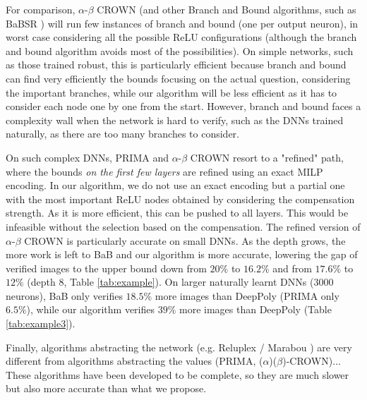 For comparison, $\alpha$-$\beta$ CROWN \cite{crown} (and other Branch and Bound algorithms, such as BaBSR \cite{BaB}) will run few instances of branch and bound (one per output neuron), in worst case considering all the possible ReLU configurations (although the branch and bound algorithm avoids most of the possibilities). On simple networks, such as those trained robust, this is particularly efficient because branch and bound can find very efficiently the bounds focusing on the actual question, considering the important branches, while our algorithm will be less efficient as it has to consider each node one by one from the start. However, branch and bound faces a complexity wall when the network is hard to verify, such as the DNNs trained naturally, as there are too many branches to consider.

On such complex DNNs, PRIMA and $\alpha$-$\beta$ CROWN resort to a "refined" path, where the bounds {\em on the first few layers} are refined \cite{MILP2} using an exact MILP encoding. In our algorithm, we do not use an exact encoding but a partial one with the most important ReLU nodes obtained by considering the compensation strength. As it is more efficient, this can be pushed to all layers. This would be infeasible without the selection based on the compensation. The refined version of $\alpha$-$\beta$ CROWN is particularly accurate on small DNNs. As the depth grows, the more work is left to BaB and our algorithm is more accurate, lowering the gap of verified images to the upper bound \cite{attack} down from 
$20\%$ to $16.2\%$ and from $17.6\%$ to $12\%$ (depth 8, Table \ref{tab:example}). On larger naturally learnt DNNs (3000 neurons), BaB only verifies $18.5\%$ more images than DeepPoly (PRIMA only $6.5\%$), while our algorithm verifies $39\%$ more images than DeepPoly (Table \ref{tab:example3}).

Finally, algorithms abstracting the network (e.g. Reluplex / Marabou \cite{Reluplex,katz2019marabou}) are very different from algorithms abstracting the values (PRIMA, ($\alpha$)($\beta$)-CROWN)\cite{prima,crown}$\ldots$ These algorithms have been developed to be complete, so they are much slower but also more accurate than what we propose.
